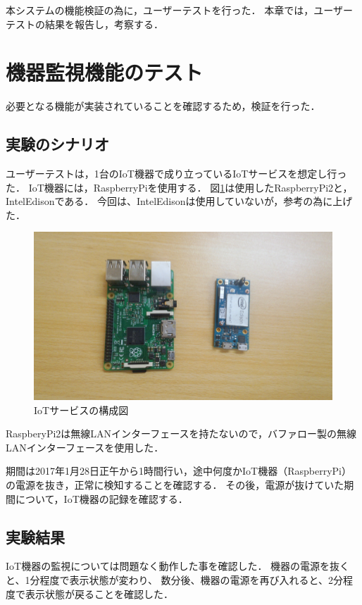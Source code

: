 本システムの機能検証の為に，ユーザーテストを行った．
本章では，ユーザーテストの結果を報告し，考察する．

\section{機器監視機能のテスト}
必要となる機能が実装されていることを確認するため，検証を行った．

\subsection{実験のシナリオ}
ユーザーテストは，1台のIoT機器で成り立っているIoTサービスを想定し行った．
IoT機器には，RaspberryPiを使用する．
図\ref{fig:device}は使用したRaspberryPi2と，IntelEdisonである．
今回は、IntelEdisonは使用していないが，参考の為に上げた．
\begin{figure}[htbp]
\includegraphics[width=14cm]{images/device.png}
\caption{IoTサービスの構成図}
\label{fig:device}
\end{figure}

RaspberyPi2は無線LANインターフェースを持たないので，バファロー製の無線LANインターフェースを使用した．

期間は2017年1月28日正午から1時間行い，途中何度かIoT機器（RaspberryPi）の電源を抜き，正常に検知することを確認する．
その後，電源が抜けていた期間について，IoT機器の記録を確認する．

\subsection{実験結果}
IoT機器の監視については問題なく動作した事を確認した．
機器の電源を抜くと、1分程度で表示状態が変わり、
数分後、機器の電源を再び入れると、2分程度で表示状態が戻ることを確認した．

